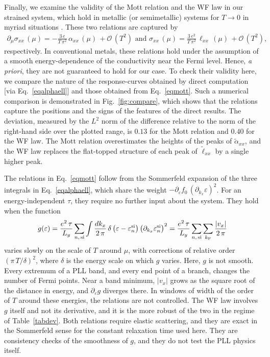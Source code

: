 \documentclass[aps,prb, onecolumn, nofootinbib, citeautoscript,10pt]{revtex4-2}
\begin{document}
Finally, we examine the validity of the Mott relation and the WF law in our strained system, which hold in metallic (or semimetallic) systems for $T  \rightarrow  0 $ in myriad situations \cite{ips-ruiz, ips-rsw-ph, ips-mwsm-floquet}. 
These two relations are captured by
\begin{align}
\label{eqmott}
\partial_{\mu} \sigma_{xx}\,(\mu)
= - \frac{3 \, e}{T \, \pi^{2}}\, \alpha_{xx} \, (\mu) \,
+ \mathcal{O}\,\left(T^2\right) \text{ and }
\sigma_{xx}\,(\mu)
= \frac{3 \, e^{2}}{T \, \pi^{2}}\, \ell_{xx}\,(\mu)\,
+ \mathcal{O}\,\left(T^2\right),
\end{align}
respectively.
In conventional metals, these relations hold under the assumption of a smooth energy-dependence of the conductivity near the Fermi level. 
Hence, \textit{a priori}, they are not guaranteed to hold for our case. To check their validity here, we compare the nature of the response-curves obtained by direct computation [via Eq.~\eqref{eqalphaell}] and those obtained from Eq.~\eqref{eqmott}. Such a numerical comparison is demonstrated in Fig.~\ref{fig:compare}, which shows that the relations capture the positions and the signs of the features of the direct results. The deviation, measured by the $L^2$ norm of the difference relative to the norm of the right-hand side over the plotted range, is $0.13$ for the Mott relation and $0.40$ for the WF law. The Mott relation overestimates the heights of the peaks of $\tilde\alpha_{xx}$, and the WF law replaces the flat-topped structure of each peak of $\tilde\ell_{xx}$ by a single higher peak.


The relations in Eq.~\eqref{eqmott} follow from the Sommerfeld expansion of the three integrals in Eq.~\eqref{eqalphaell}, which share the weight $-\partial_\varepsilon f_0\,(\partial_{k_x}\varepsilon)^2$. For an energy-independent $\tau$, they require no further input about the system. They hold when the function
\begin{align}
g(\varepsilon)=\frac{e^2\,\tau}{L_y}\sum_{n,\,{\rm si}}\int\frac{dk_x}{2\,\pi}\,\delta\left(\varepsilon-\varepsilon_n^{\rm si}\right)\left(\partial_{k_x}\varepsilon^{\rm si}_n\right)^2=\frac{e^2\,\tau}{L_y}\sum_{n,\,{\rm si}}\sum_{k_{\rm F}}\frac{|v_x|}{2\,\pi}
\end{align}
varies slowly on the scale of $T$ around $\mu$, with corrections of relative order $(\pi\,T/\delta)^2$, where $\delta$ is the energy scale on which $g$ varies. Here, $g$ is not smooth. Every extremum of a PLL band, and every end point of a branch, changes the number of Fermi points. Near a band minimum, $|v_x|$ grows as the square root of the distance in energy, and $\partial_\varepsilon g$ diverges there. In windows of width of the order of $T$ around these energies, the relations are not controlled. The WF law involves $g$ itself and not its derivative, and it is the more robust of the two in the regime of Table~\ref{tabdev}. Both relations require elastic scattering, and they are exact in the Sommerfeld sense for the constant relaxation time used here. They are consistency checks of the smoothness of $g$, and they do not test the PLL physics itself.
\end{document}
